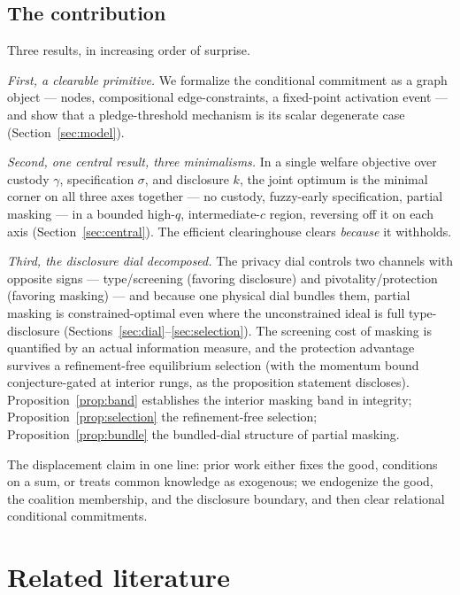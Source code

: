 \documentclass[11pt]{article}
\theoremstyle{definition}
\theoremstyle{remark}
\begin{document}
\subsection{The contribution}

Three results, in increasing order of surprise.

\emph{First, a clearable primitive.} We formalize the conditional commitment as a graph
object --- nodes, compositional edge-constraints, a fixed-point activation event --- and
show that a pledge-threshold mechanism is its scalar degenerate case
(Section~\ref{sec:model}).

\emph{Second, one central result, three minimalisms.} In a single welfare objective over custody
$\gamma$, specification $\sigma$, and disclosure $k$, the joint optimum is the minimal
corner on all three axes together --- no custody, fuzzy-early specification, partial
masking --- in a bounded high-$q$, intermediate-$c$ region, reversing off it on each axis
(Section~\ref{sec:central}). The efficient clearinghouse clears \emph{because} it
withholds.

\emph{Third, the disclosure dial decomposed.} The privacy dial controls two channels with
opposite signs --- type/screening (favoring disclosure) and pivotality/protection (favoring
masking) --- and because one physical dial bundles them, partial masking is
constrained-optimal even where the unconstrained ideal is full type-disclosure
(Sections~\ref{sec:dial}--\ref{sec:selection}). The screening cost of masking is quantified
by an actual information measure, and the protection advantage survives a refinement-free
equilibrium selection (with the momentum bound conjecture-gated at interior rungs, as the
proposition statement discloses). Proposition~\ref{prop:band} establishes the interior masking band in
integrity; Proposition~\ref{prop:selection} the refinement-free selection;
Proposition~\ref{prop:bundle} the bundled-dial structure of partial masking.

The displacement claim in one line: prior work either fixes the good, conditions on a sum,
or treats common knowledge as exogenous; we endogenize the good, the coalition membership,
and the disclosure boundary, and then clear relational conditional commitments.

\section{Related literature}\label{sec:lit}
\end{document}
